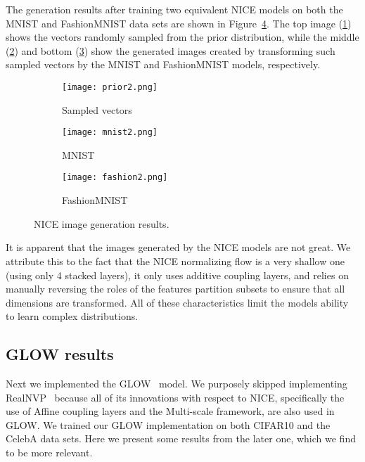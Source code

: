 The generation results after training two equivalent NICE models on both the MNIST and FashionMNIST data sets are shown in Figure~\ref{fig:nice_results}. The top image (\ref{fig:random_samples}) shows the vectors randomly sampled from the prior distribution, while the middle (\ref{fig:mnist_results}) and bottom (\ref{fig:fashion_results}) show the generated images created by transforming such sampled vectors by the MNIST and FashionMNIST models, respectively.

\begin{figure}[htbp!]
     \centering
     \begin{subfigure}[b]{0.3\textwidth}
         \centering
         \texttt{[image: prior2.png]}
         \caption{Sampled vectors}
         \label{fig:random_samples}
     \end{subfigure} 
     \hfill
     \begin{subfigure}[b]{0.3\textwidth}
         \centering
         \texttt{[image: mnist2.png]}
         \caption{MNIST}
         \label{fig:mnist_results}
     \end{subfigure}
     \hfill
     \begin{subfigure}[b]{0.3\textwidth}
         \centering
         \texttt{[image: fashion2.png]}
         \caption{FashionMNIST}
         \label{fig:fashion_results}
     \end{subfigure}
     \caption{NICE image generation results.}
     \label{fig:nice_results}
\end{figure}

It is apparent that the images generated by the NICE models are not great. We attribute this to the fact that the NICE normalizing flow is a very shallow one (using only 4 stacked layers), it only uses additive coupling layers, and relies on manually reversing the roles of the features partition subsets to ensure that all dimensions are transformed. All of these characteristics limit the models ability to learn complex distributions. 

\subsection{GLOW results}

Next we implemented the GLOW~\cite{glow} model. We purposely skipped implementing RealNVP~\cite{realnvp} because all of its innovations with respect to NICE, specifically the use of Affine coupling layers and the Multi-scale framework, are also used in GLOW. We trained our GLOW implementation on both CIFAR10 and the CelebA data sets. Here we present some results from the later one, which we find to be more relevant.

